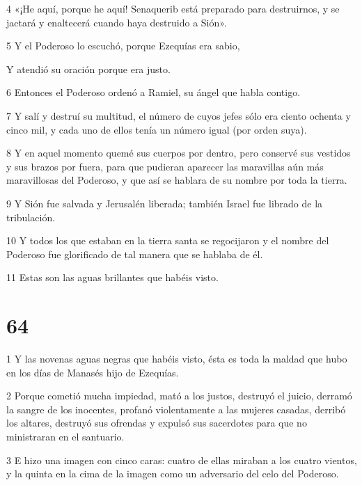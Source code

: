 \par 4 «¡He aquí, porque he aquí! Senaquerib está preparado para destruirnos, y se jactará y enaltecerá cuando haya destruido a Sión».

\par 5 Y el Poderoso lo escuchó, porque Ezequías era sabio,

\par Y atendió su oración porque era justo.

\par 6 Entonces el Poderoso ordenó a Ramiel, su ángel que habla contigo.

\par 7 Y salí y destruí su multitud, el número de cuyos jefes sólo era ciento ochenta y cinco mil, y cada uno de ellos tenía un número igual (por orden suya).

\par 8 Y en aquel momento quemé sus cuerpos por dentro, pero conservé sus vestidos y sus brazos por fuera, para que pudieran aparecer las maravillas aún más maravillosas del Poderoso, y que así se hablara de su nombre por toda la tierra.

\par 9 Y Sión fue salvada y Jerusalén liberada; también Israel fue librado de la tribulación.

\par 10 Y todos los que estaban en la tierra santa se regocijaron y el nombre del Poderoso fue glorificado de tal manera que se hablaba de él.

\par 11 Estas son las aguas brillantes que habéis visto.

\chapter{64}

\par 1 Y las novenas aguas negras que habéis visto, ésta es toda la maldad que hubo en los días de Manasés hijo de Ezequías.

\par 2 Porque cometió mucha impiedad, mató a los justos, destruyó el juicio, derramó la sangre de los inocentes, profanó violentamente a las mujeres casadas, derribó los altares, destruyó sus ofrendas y expulsó sus sacerdotes para que no ministraran en el santuario.

\par 3 E hizo una imagen con cinco caras: cuatro de ellas miraban a los cuatro vientos, y la quinta en la cima de la imagen como un adversario del celo del Poderoso.


